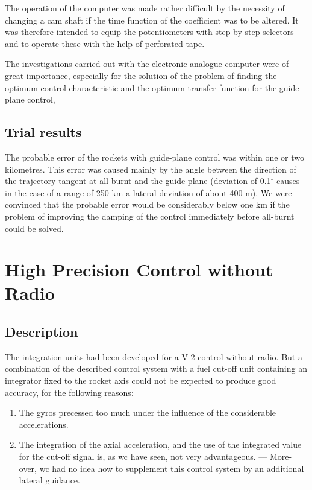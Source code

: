 \documentclass[12pt, a4paper]{article}
\begin{document}
The operation of the computer was made rather difficult by the necessity of changing a cam shaft if the time function of the coefficient was to be altered. It was therefore intended to equip the potentiometers with step-by-step selectors and to operate these with the help of perforated tape.

The investigations carried out with the electronic analogue computer were of great importance, especially for the solution of the problem of finding the optimum control characteristic and the optimum transfer function for the guide-plane control,

\subsection{Trial results}

The probable error of the rockets with guide-plane control was within one or two kilometres. This error was caused mainly by the angle between the direction of the trajectory tangent at all-burnt and the guide-plane (deviation of 0.1$^{\circ}$ causes in the case of a range of 250 km a lateral deviation of about 400 m). We were convinced that the probable error would be considerably below one km if the problem of improving the damping of the control immediately before all-burnt could be solved.

\section{High Precision Control without Radio}

\subsection{Description}

The integration units had been developed for a V-2-control without radio. But a combination of the described control system with a fuel cut-off unit containing an integrator fixed to the rocket axis could not be expected to produce good accuracy, for the following reasons:

\begin{enumerate}
  \item The gyros precessed too much under the influence of the considerable accelerations.

  \item The integration of the axial acceleration, and the use of the integrated value for the cut-off signal is, as wc have seen, not very advantageous. — More- over, wc had no idea how to supplement this control system by an additional lateral guidance.
\end{enumerate}
\end{document}
